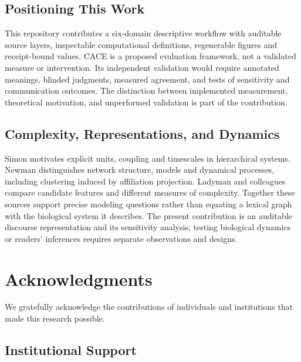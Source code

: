 \documentclass[
]{article}
\numberwithin{equation}{section}
\begin{document}
\subsection{Positioning This Work}\label{positioning-this-work}

This repository contributes a six-domain descriptive workflow with
auditable source layers, inspectable computational definitions,
regenerable figures and receipt-bound values. CACE is a proposed
evaluation framework, not a validated measure or intervention. Its
independent validation would require annotated meanings, blinded
judgments, measured agreement, and tests of sensitivity and
communication outcomes. The distinction between implemented measurement,
theoretical motivation, and unperformed validation is part of the
contribution.

\subsection{Complexity, Representations, and
Dynamics}\label{complexity-representations-and-dynamics}

Simon \citep{simon1962architecture} motivates explicit units, coupling
and timescales in hierarchical systems. Newman
\citep{newman2003structure} distinguishes network structure, models and
dynamical processes, including clustering induced by affiliation
projection. Ladyman and colleagues \citep{ladyman2013complex} compare
candidate features and different measures of complexity. Together these
sources support precise modeling questions rather than equating a
lexical graph with the biological system it describes. The present
contribution is an auditable discourse representation and its
sensitivity analysis; testing biological dynamics or readers' inferences
requires separate observations and designs.

\clearpage

\section{Acknowledgments}\label{sec:acknowledgments}

We gratefully acknowledge the contributions of individuals and
institutions that made this research possible.

\subsection{Institutional Support}\label{institutional-support}
\end{document}
